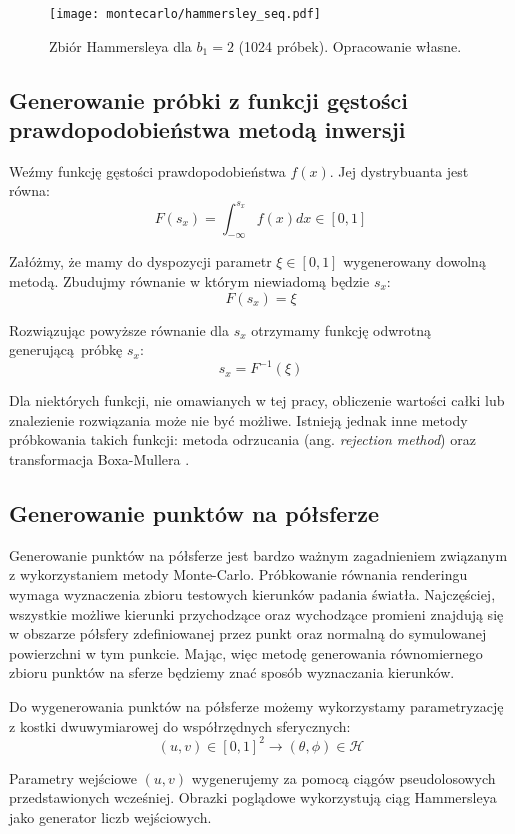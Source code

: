 \documentclass[../main.tex]{subfiles}
\begin{document}
\begin{figure}[h]
  \centering
  \texttt{[image: montecarlo/hammersley\_seq.pdf]}
  \caption{Zbiór Hammersleya dla $b_1=2$ (1024 próbek). Opracowanie własne.}
  \label{fig:HammersleySamples}
\end{figure}

\subsection{Generowanie próbki z funkcji gęstości prawdopodobieństwa metodą inwersji}
\label{section:pdfsampling}

Weźmy funkcję gęstości prawdopodobieństwa $f(x)$. Jej dystrybuanta jest równa:
\[ 
F(s_x) = \int_{-\infty}^{s_{x}} f(x) dx \in [0,1] 
\]

Załóżmy, że mamy do dyspozycji parametr $\xi \in [0,1]$ wygenerowany dowolną metodą. Zbudujmy równanie w którym niewiadomą będzie $s_x$:
\[ 
F(s_x) = \xi
\]

Rozwiązując powyższe równanie dla $s_x$ otrzymamy funkcję odwrotną generującą próbkę $s_x$:
\[
s_x = F^{-1}(\xi)
\]

Dla niektórych funkcji, nie omawianych w tej pracy, obliczenie wartości całki lub znalezienie rozwiązania może nie być możliwe. Istnieją jednak inne metody próbkowania takich funkcji: metoda odrzucania (ang. \textit{rejection method}) oraz transformacja Boxa-Mullera \cite{pbrt}.

\subsection{Generowanie punktów na półsferze}

Generowanie punktów na półsferze jest bardzo ważnym zagadnieniem związanym z wykorzystaniem metody Monte-Carlo. Próbkowanie równania renderingu wymaga wyznaczenia zbioru testowych kierunków padania światła. Najczęściej, wszystkie możliwe kierunki przychodzące oraz wychodzące promieni znajdują się w obszarze półsfery zdefiniowanej przez punkt oraz normalną do symulowanej powierzchni w tym punkcie. Mając, więc metodę generowania równomiernego zbioru punktów na sferze będziemy znać sposób wyznaczania kierunków.

Do wygenerowania punktów na półsferze możemy wykorzystamy parametryzację z kostki dwuwymiarowej do współrzędnych sferycznych:
\[
  (u,v) \in [0,1]^2 \rightarrow (\theta, \phi) \in \mathcal{H}
\]

Parametry wejściowe $(u,v)$ wygenerujemy za pomocą ciągów pseudolosowych przedstawionych wcześniej. Obrazki poglądowe wykorzystują ciąg Hammersleya jako generator liczb wejściowych.
\end{document}
